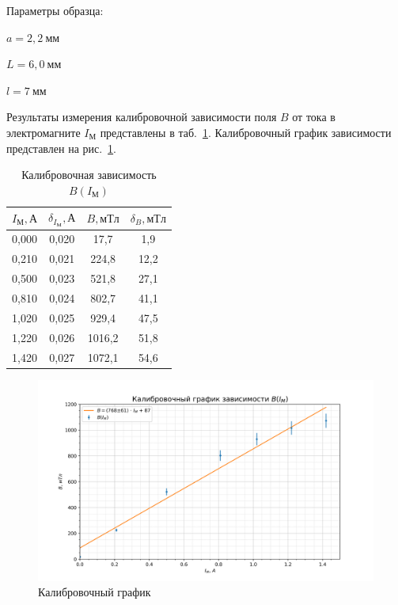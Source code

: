 \documentclass[a4paper, 12pt]{article}
\begin{document}
Параметры образца:
\begin{description}
\item{} $a = 2,2~мм$
\item{} $L = 6,0~мм$
\item{} $l = 7~мм$
\end{description}

Результаты измерения калибровочной зависимости поля $B$ от тока в электромагните $I_М$ представлены в таб.~\ref{tab1}. Калибровочный график зависимости представлен на рис.~\ref{plot1}.

\begin{table}[h!]
\begin{center}
\begin{tabular}{|c|c|c|c|}
\hline
$I_М, А$ & $\delta_{I_М}, А$ & $B, мТл$ & $\delta_B, мТл$ \\ \hline
0,000 & 0,020  & 17,7   & 1,9     \\ \hline
0,210 & 0,021  & 224,8  & 12,2    \\ \hline
0,500 & 0,023  & 521,8  & 27,1    \\ \hline
0,810 & 0,024  & 802,7  & 41,1    \\ \hline
1,020 & 0,025  & 929,4  & 47,5    \\ \hline
1,220 & 0,026  & 1016,2 & 51,8    \\ \hline
1,420 & 0,027  & 1072,1 & 54,6    \\ \hline
\end{tabular}
\end{center}
\caption{Калибровочная зависимость $B(I_М)$}
\label{tab1}
\end{table}

\begin{figure}[h!]
\begin{center}
    \includegraphics[scale=0.7]{3.3.4_1.png}
\end{center}
\caption{Калибровочный график}
\label{plot1}
\end{figure}
\end{document}
